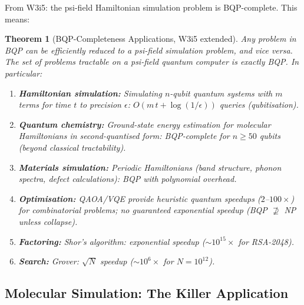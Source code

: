 \documentclass[11pt]{article}
\newtheorem{theorem}{Theorem}[section]
\theoremstyle{definition}
\theoremstyle{remark}
\begin{document}
From W3i5: the psi-field Hamiltonian simulation problem is BQP-complete.
This means:

\begin{theorem}[BQP-Completeness Applications, W3i5 extended]
\label{thm:bqp-apps}
Any problem in BQP can be efficiently reduced to a psi-field simulation
problem, and vice versa. The set of problems tractable on a psi-field
quantum computer is \emph{exactly} BQP. In particular:

\begin{enumerate}
\item \textbf{Hamiltonian simulation:} Simulating $n$-qubit quantum
  systems with $m$ terms for time $t$ to precision $\epsilon$:
  $O(m\,t + \log(1/\epsilon))$ queries (qubitisation).

\item \textbf{Quantum chemistry:} Ground-state energy estimation for
  molecular Hamiltonians in second-quantised form: BQP-complete for
  $n \geq 50$ qubits (beyond classical tractability).

\item \textbf{Materials simulation:} Periodic Hamiltonians (band
  structure, phonon spectra, defect calculations): BQP with polynomial
  overhead.

\item \textbf{Optimisation:} QAOA/VQE provide heuristic quantum
  speedups ($2$--$100\times$) for combinatorial problems; no
  guaranteed exponential speedup (BQP $\not\supseteq$ NP unless
  collapse).

\item \textbf{Factoring:} Shor's algorithm: exponential speedup
  ($\sim 10^{15}\times$ for RSA-2048).

\item \textbf{Search:} Grover: $\sqrt{N}$ speedup ($\sim 10^6\times$
  for $N = 10^{12}$).
\end{enumerate}
\end{theorem}

\subsection{Molecular Simulation: The Killer Application}
\label{sec:molecular-sim}
\end{document}
